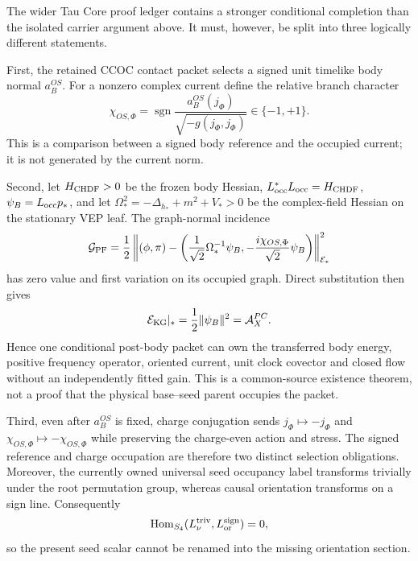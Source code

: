 \documentclass[11pt]{article}
\begin{document}
The wider Tau Core proof ledger contains a stronger conditional completion
than the isolated carrier argument above. It must, however, be split into
three logically different statements.

First, the retained CCOC contact packet selects a signed unit timelike body
normal $a_B^{OS}$. For a nonzero complex current define the relative branch
character
\begin{equation}
 \chi_{OS,\Phi}
 =\operatorname{sgn}
 \frac{a_B^{OS}(j_\Phi)}{\sqrt{-g(j_\Phi,j_\Phi)}}\in\{-1,+1\}.
 \label{eq:relative-character}
\end{equation}
This is a comparison between a signed body reference and the occupied current;
it is not generated by the current norm.

Second, let $H_{\rm CHDF}>0$ be the frozen body Hessian,
$L_{\rm occ}^*L_{\rm occ}=H_{\rm CHDF}$,
$\psi_B=L_{\rm occ}p_*$, and let
$\Omega_*^2=-\Delta_{h_*}+m^2+V_*>0$ be the complex-field Hessian on the
stationary VEP leaf. The graph-normal incidence
\begin{equation}
 \mathcal G_{\rm PF}=\frac12
 \left\| (\phi,\pi)-
 \left(\frac{1}{\sqrt2}\Omega_*^{-1}\psi_B,
 -\frac{i\chi_{OS,\Phi}}{\sqrt2}\psi_B\right)
 \right\|_{\mathcal E_*}^2
 \label{eq:clock-flow-graph}
\end{equation}
has zero value and first variation on its occupied graph. Direct substitution
then gives
\begin{equation}
 \mathcal E_{\rm KG}|_*=\frac12\|\psi_B\|^2
 =\mathcal A_X^{PC}.
 \label{eq:clock-energy-isometry}
\end{equation}
Hence one conditional post-body packet can own the transferred body energy,
positive frequency operator, oriented current, unit clock covector and closed
flow without an independently fitted gain. This is a common-source existence
theorem, not a proof that the physical base--seed parent occupies the packet.

Third, even after $a_B^{OS}$ is fixed, charge conjugation sends
$j_\Phi\mapsto-j_\Phi$ and
$\chi_{OS,\Phi}\mapsto-\chi_{OS,\Phi}$ while preserving the charge-even
action and stress. The signed reference and charge occupation are therefore
two distinct selection obligations. Moreover, the currently owned universal
seed occupancy label transforms trivially under the root permutation group,
whereas causal orientation transforms on a sign line. Consequently
\begin{equation}
 \operatorname{Hom}_{S_4}
 (L_\nu^{\rm triv},L_{\rm or}^{\rm sign})=0,
 \label{eq:seed-orientation-no-go}
\end{equation}
so the present seed scalar cannot be renamed into the missing orientation
section.
\end{document}
